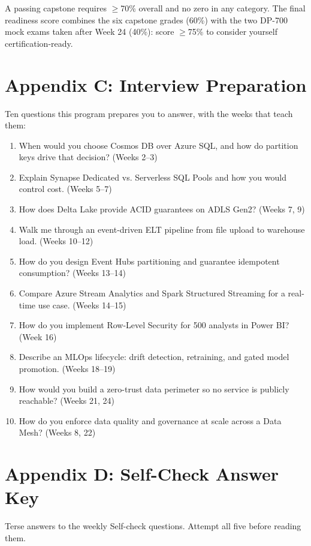 \documentclass[11pt, a4paper]{article}
\begin{document}
A passing capstone requires $\geq$70\% overall and no zero in any category. The final readiness score combines the six capstone grades (60\%) with the two DP-700 mock exams taken after Week 24 (40\%): score $\geq$75\% to consider yourself certification-ready.

\section{Appendix C: Interview Preparation}
Ten questions this program prepares you to answer, with the weeks that teach them:

\begin{enumerate}
    \item When would you choose Cosmos DB over Azure SQL, and how do partition keys drive that decision? (Weeks 2--3)
    \item Explain Synapse Dedicated vs. Serverless SQL Pools and how you would control cost. (Weeks 5--7)
    \item How does Delta Lake provide ACID guarantees on ADLS Gen2? (Weeks 7, 9)
    \item Walk me through an event-driven ELT pipeline from file upload to warehouse load. (Weeks 10--12)
    \item How do you design Event Hubs partitioning and guarantee idempotent consumption? (Weeks 13--14)
    \item Compare Azure Stream Analytics and Spark Structured Streaming for a real-time use case. (Weeks 14--15)
    \item How do you implement Row-Level Security for 500 analysts in Power BI? (Week 16)
    \item Describe an MLOps lifecycle: drift detection, retraining, and gated model promotion. (Weeks 18--19)
    \item How would you build a zero-trust data perimeter so no service is publicly reachable? (Weeks 21, 24)
    \item How do you enforce data quality and governance at scale across a Data Mesh? (Weeks 8, 22)
\end{enumerate}

\section{Appendix D: Self-Check Answer Key}
Terse answers to the weekly Self-check questions. Attempt all five before reading them.
\end{document}
